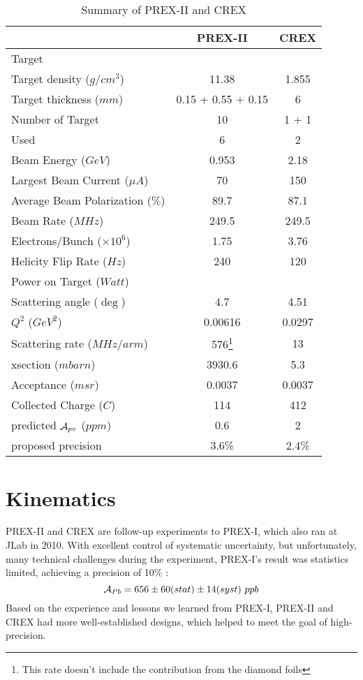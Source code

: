 \begin{table}[h]
    \centering
    \begin{tabular}{l | c c }
	\hline
	&   PREX-II & CREX  \\
	\hline
	Target	& \Pb	& \Ca	\\
	Target density ($g/cm^3$)   & 11.38 & 1.855	\\
	Target thickness ($mm$)	& 0.15 + 0.55 + 0.15	& 6	\\
	Number of Target & 10 & 1 + 1	\\
	Used	& 6 & 2	\\
	\hline
	Beam Energy ($GeV$) & 0.953 & 2.18  \\
	Largest Beam Current ($\mu A$)	& 70	& 150	\\
	Average Beam Polarization ($\%$) & 89.7   & 87.1   \\
	Beam Rate ($MHz$) & 249.5	& 249.5 \\
	Electrons/Bunch	($\times 10^6$)	& 1.75	& 3.76	\\
	Helicity Flip Rate ($Hz$)  & 240   & 120   \\
	Power on Target ($Watt$)	&   &	\\
	\hline
	Scattering angle ($\deg$)   & 4.7	& 4.51 \\
	$Q^2$ ($GeV^2$)	& 0.00616   & 0.0297	\\
	Scattering rate ($MHz/arm$)   & 576\footnote{This rate doesn't include the contribution from the diamond foils}   & 13 \\
	xsection ($mbarn$)    & 3930.6	& 5.3   \\
	Acceptance ($msr$)    &	0.0037 & 0.0037  \\
	\hline
	Collected Charge ($C$)	& 114	& 412	\\
	\hline
	predicted $\mathcal{A}_{pv}$ ($ppm$)	& 0.6   & 2 \\
	proposed precision  & 3.6\%   & 2.4\% \\
	\hline
    \end{tabular}
    \caption{Summary of PREX-II and CREX}
    \label{tb:parameters}
\end{table}

\section{Kinematics}
PREX-II and CREX are follow-up experiments to PREX-I, which also ran at JLab in 2010. 
With excellent control of systematic uncertainty, but unfortunately, 
many technical challenges during the experiment, PREX-I's result was statistics 
limited, achieving a precision of 10\% \cite{PhysRevLett.108.112502}:
$$ \CA_{Pb} = 656 \pm 60 (stat) \pm 14 (syst) \ ppb$$
Based on the experience and lessons we learned from PREX-I, 
PREX-II and CREX had more well-established designs, which helped to
meet the goal of high-precision.

